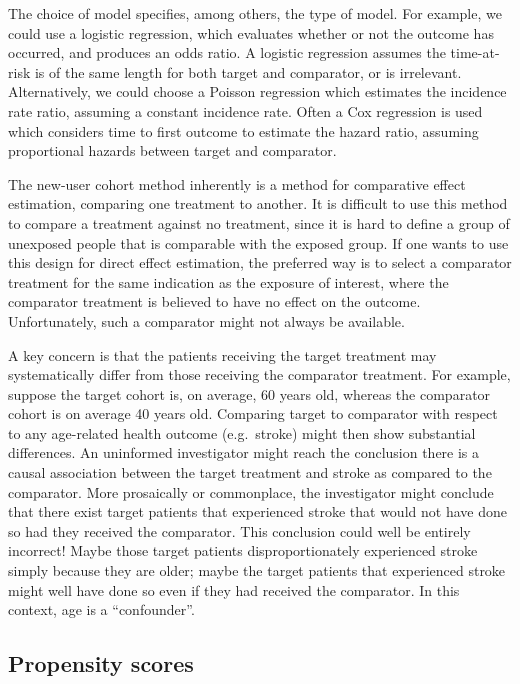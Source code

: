 \documentclass[11pt]{book}
\theoremstyle{definition}
\theoremstyle{definition}
\theoremstyle{definition}
\theoremstyle{remark}
\let\BeginKnitrBlock\begin \let\EndKnitrBlock\end
\begin{document}
The choice of model specifies, among others, the type of model. For example, we could use a logistic regression, which evaluates whether or not the outcome has occurred, and produces an odds ratio. A logistic regression assumes the time-at-risk is of the same length for both target and comparator, or is irrelevant. Alternatively, we could choose a Poisson regression which estimates the incidence rate ratio, assuming a constant incidence rate. Often a Cox regression is used which considers time to first outcome to estimate the hazard ratio, assuming proportional hazards between target and comparator.    

\BeginKnitrBlock{rmdimportant}
The new-user cohort method inherently is a method for comparative effect estimation, comparing one treatment to another. It is difficult to use this method to compare a treatment against no treatment, since it is hard to define a group of unexposed people that is comparable with the exposed group. If one wants to use this design for direct effect estimation, the preferred way is to select a comparator treatment for the same indication as the exposure of interest, where the comparator treatment is believed to have no effect on the outcome. Unfortunately, such a comparator might not always be available.
\EndKnitrBlock{rmdimportant}

A key concern is that the patients receiving the target treatment may systematically differ from those receiving the comparator treatment. For example, suppose the target cohort is, on average, 60 years old, whereas the comparator cohort is on average 40 years old. Comparing target to comparator with respect to any age-related health outcome (e.g.~stroke) might then show substantial differences. An uninformed investigator might reach the conclusion there is a causal association between the target treatment and stroke as compared to the comparator. More prosaically or commonplace, the investigator might conclude that there exist target patients that experienced stroke that would not have done so had they received the comparator. This conclusion could well be entirely incorrect! Maybe those target patients disproportionately experienced stroke simply because they are older; maybe the target patients that experienced stroke might well have done so even if they had received the comparator. In this context, age is a ``confounder''. 

\hypertarget{propensity-scores}{%
\subsection{Propensity scores}\label{propensity-scores}}
\end{document}
